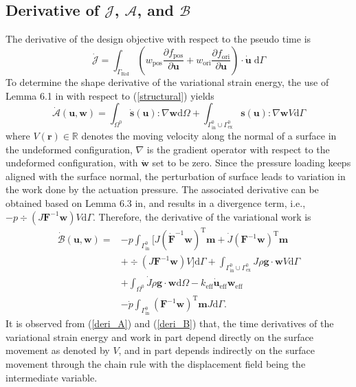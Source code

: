 \documentclass[journal]{IEEEtran}
\renewcommand{\vec}[1]{\mathbf{#1}}
\theoremstyle{definition}
\renewcommand{\vec}[1]{\mathbf{#1}}
\begin{document}
\subsection{Derivative of $\mathcal{J}$, $\mathcal{A}$, and $\mathcal{B}$}
The derivative of the design objective with respect to the pseudo time is
\begin{equation}\label{Jdot}
  \dot{\mathcal{J}}=\int_{\Gamma_{\text{RoI}}} \left(w_{\text{pos}}\frac{\partial f_{\text{pos}}}{\partial \vec{u}} + w_{\text{ori}}\frac{\partial f_{\text{ori}}}{\partial \vec{u}}\right) \cdot \dot{\vec{u}} \; \mathrm{d} \Gamma
\end{equation}
To determine the shape derivative of the variational strain energy, the use of Lemma 6.1 in\cite{choi2006} with respect to (\ref{structural}) yields
\begin{equation}\label{deri_A}
  \dot{\mathcal{A}} (\vec{u},\vec{w}) =  \int_{\Omega^{0}}  \dot{\vec{s}}(\vec{u}): \nabla\vec{w} \mathrm{d}\Omega +\int_{\Gamma_{\text {in}}^{0} \cup \Gamma_{\text {ex}}^{0}} \vec{s}(\vec{u}): \nabla\vec{w} V \mathrm{d}\Gamma
\end{equation}
where $V(\vec{r})\in\mathbb{R}$ denotes the moving velocity along the normal of a surface in the undeformed configuration, $\nabla$ is the gradient operator with respect to the undeformed configuration, with $\dot{\vec{w}}$ set to be zero. Since the pressure loading keeps aligned with the surface normal, the perturbation of surface leads to variation in the work done by the actuation pressure. The associated derivative can be obtained based on Lemma 6.3 in\cite{choi2006}, and results in a divergence term, i.e., $-p\div\left(J\vec{F}^{-1}\vec{w}\right)V\mathrm{d}\Gamma$. Therefore, the derivative of the variational work is
\begin{equation}\label{deri_B}
  \begin{aligned}
    \dot{\mathcal{B}}(\vec{u}, \vec{w})= & -p\int_{\Gamma_{\text {in}}^{0}} \bigl[J(\dot{\vec{F}}^{-1}\vec{w})^\text{T}\vec{m}+\dot{J}(\vec{F}^{-1}\vec{w})^\text{T}\vec{m}                                           \\
                                         & +\div\left(J\vec{F}^{-1}\vec{w}\right)V\bigr]\mathrm{d}\Gamma +\int_{\Gamma_{\text {in}}^{0} \cup \Gamma_{\text {ex}}^{0}} J\rho\mathbf{g}\cdot\mathbf{w}V\mathrm{d}\Gamma \\
                                         & + \int_{\Omega^0} \dot{J}\rho\mathbf{g}\cdot\mathbf{w}\mathrm{d}\Omega - k_\text{eff}\dot{\vec{u}}_\text{eff}\vec{w}_\text{eff}                                            \\
                                         & -\dot{p} \int_{\Gamma_{\text{in}}^{0}} (\vec{F}^{-1}\vec{w})^\text{T} \vec{m} J \mathrm{d} \Gamma.
  \end{aligned}
\end{equation}
It is observed from (\ref{deri_A}) and (\ref{deri_B}) that, the time derivatives of the variational strain energy and work in part depend directly on the surface movement as denoted by $V$, and in part depends indirectly on the surface movement through the chain rule with the displacement field being the intermediate variable.
\end{document}
